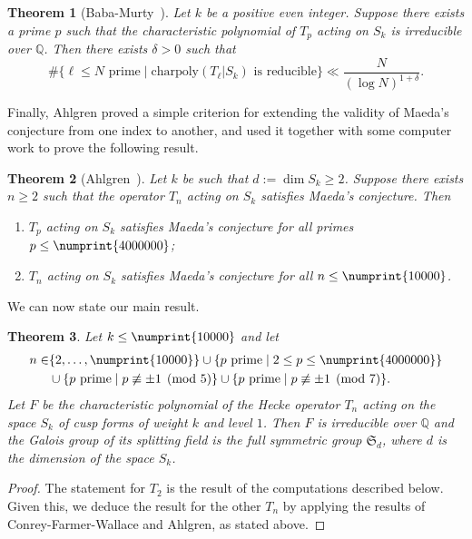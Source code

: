 \documentclass[11pt]{article}
\theoremstyle{plain}
\newtheorem{theorem}{Theorem}[section]
\theoremstyle{definition}
\theoremstyle{remark}
\numberwithin{equation}{section}
\newcommand{\QQ}{\mathbb{Q}}
\renewcommand{\SS}{\mathfrak{S}}
\newcommand{\bound}{\numprint{10000}}
\begin{document}
\begin{theorem}[Baba-Murty~\cite{BabaMurty}]
  Let $k$ be a positive even integer.  Suppose there exists a prime $p$ such
  that the characteristic polynomial of $T_p$ acting on $S_k$ is irreducible
  over $\QQ$.  Then there exists $\delta>0$ such that
  \begin{equation*}
    \#\{\ell\leq N\text{ prime}\mid \text{charpoly}(T_\ell|S_k)\text{ is reducible}\}
    \ll \frac{N}{(\log N)^{1+\delta}}.
  \end{equation*}
\end{theorem}

Finally, Ahlgren proved a simple criterion for extending the validity of
Maeda's conjecture from one index to another, and used it together with some
computer work to prove the following result.

\begin{theorem}[Ahlgren~\cite{Ahlgren}]\label{thm:Ahl}
  Let $k$ be such that $d:=\dim S_k\geq 2$.  Suppose there exists $n\geq 2$
  such that the operator $T_n$ acting on $S_k$ satisfies Maeda's conjecture.
  Then
  \begin{enumerate}
    \item $T_p$ acting on $S_k$ satisfies Maeda's conjecture for all primes
      $p\leq\numprint{4000000}$;
    \item $T_n$ acting on $S_k$ satisfies Maeda's conjecture for all
      $n\leq\numprint{10000}$.
  \end{enumerate}
\end{theorem}


We can now state our main result.

\begin{theorem}\label{thm:main}
  Let $k\leq \bound$ and let
  \begin{align*}
    n\in &\{2,\ldots,\numprint{10000}\}\cup
    \{p\text{ prime}\mid 2\leq p\leq\numprint{4000000}\}\\
    &\cup\{p\text{ prime}\mid p\not\equiv\pm 1\pmod{5}\}\cup
    \{p\text{ prime}\mid p\not\equiv\pm 1\pmod{7}\}.
  \end{align*}
  Let $F$ be the characteristic polynomial of the
  Hecke operator $T_n$ acting on the space $S_k$ of cusp forms of weight
  $k$ and level $1$.  Then $F$ is irreducible over $\QQ$ and the Galois
  group of its splitting field is the full symmetric group $\SS_d$, 
  where $d$ is the dimension of the space $S_k$.
\end{theorem}
\begin{proof}
  The statement for $T_2$ is the result of the computations described below.  
  Given this, we deduce the result for the other $T_n$ by applying the results of
  Conrey-Farmer-Wallace and Ahlgren, as stated above.
\end{proof}
\end{document}
